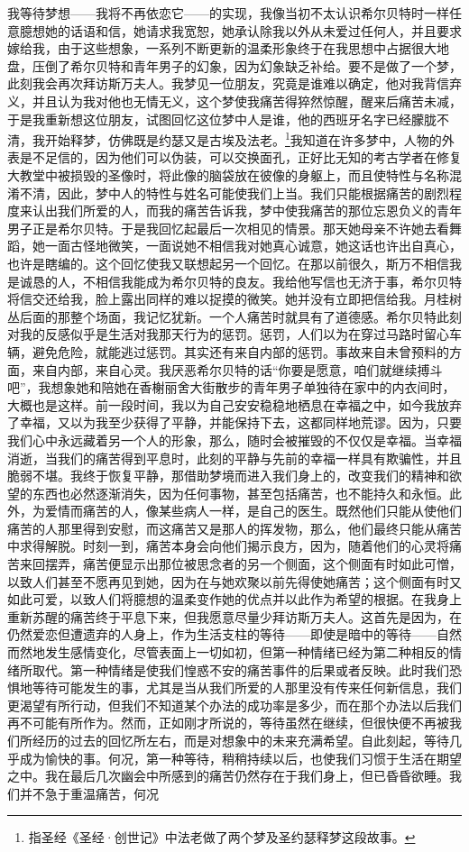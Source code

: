 \par 我等待梦想——我将不再依恋它——的实现，我像当初不太认识希尔贝特时一样任意臆想她的话语和信，她请求我宽恕，她承认除我以外从未爱过任何人，并且要求嫁给我，由于这些想象，一系列不断更新的温柔形象终于在我思想中占据很大地盘，压倒了希尔贝特和青年男子的幻象，因为幻象缺乏补给。要不是做了一个梦，此刻我会再次拜访斯万夫人。我梦见一位朋友，究竟是谁难以确定，他对我背信弃义，并且认为我对他也无情无义，这个梦使我痛苦得猝然惊醒，醒来后痛苦未减，于是我重新想这位朋友，试图回忆这位梦中人是谁，他的西班牙名字已经朦胧不清，我开始释梦，仿佛既是约瑟又是古埃及法老。\footnote{指圣经《圣经·创世记》中法老做了两个梦及圣约瑟释梦这段故事。}我知道在许多梦中，人物的外表是不足信的，因为他们可以伪装，可以交换面孔，正好比无知的考古学者在修复大教堂中被损毁的圣像时，将此像的脑袋放在彼像的身躯上，而且使特性与名称混淆不清，因此，梦中人的特性与姓名可能使我们上当。我们只能根据痛苦的剧烈程度来认出我们所爱的人，而我的痛苦告诉我，梦中使我痛苦的那位忘恩负义的青年男子正是希尔贝特。于是我回忆起最后一次相见的情景。那天她母亲不许她去看舞蹈，她一面古怪地微笑，一面说她不相信我对她真心诚意，她这话也许出自真心，也许是瞎编的。这个回忆使我又联想起另一个回忆。在那以前很久，斯万不相信我是诚恳的人，不相信我能成为希尔贝特的良友。我给他写信也无济于事，希尔贝特将信交还给我，脸上露出同样的难以捉摸的微笑。她并没有立即把信给我。月桂树丛后面的那整个场面，我记忆犹新。一个人痛苦时就具有了道德感。希尔贝特此刻对我的反感似乎是生活对我那天行为的惩罚。惩罚，人们以为在穿过马路时留心车辆，避免危险，就能逃过惩罚。其实还有来自内部的惩罚。事故来自未曾预料的方面，来自内部，来自心灵。我厌恶希尔贝特的话“你要是愿意，咱们就继续搏斗吧”，我想象她和陪她在香榭丽舍大街散步的青年男子单独待在家中的内衣间时，大概也是这样。前一段时间，我以为自己安安稳稳地栖息在幸福之中，如今我放弃了幸福，又以为我至少获得了平静，并能保持下去，这都同样地荒谬。因为，只要我们心中永远藏着另一个人的形象，那么，随时会被摧毁的不仅仅是幸福。当幸福消逝，当我们的痛苦得到平息时，此刻的平静与先前的幸福一样具有欺骗性，并且脆弱不堪。我终于恢复平静，那借助梦境而进入我们身上的，改变我们的精神和欲望的东西也必然逐渐消失，因为任何事物，甚至包括痛苦，也不能持久和永恒。此外，为爱情而痛苦的人，像某些病人一样，是自己的医生。既然他们只能从使他们痛苦的人那里得到安慰，而这痛苦又是那人的挥发物，那么，他们最终只能从痛苦中求得解脱。时刻一到，痛苦本身会向他们揭示良方，因为，随着他们的心灵将痛苦来回摆弄，痛苦便显示出那位被思念者的另一个侧面，这个侧面有时如此可憎，以致人们甚至不愿再见到她，因为在与她欢聚以前先得使她痛苦；这个侧面有时又如此可爱，以致人们将臆想的温柔变作她的优点并以此作为希望的根据。在我身上重新苏醒的痛苦终于平息下来，但我愿意尽量少拜访斯万夫人。这首先是因为，在仍然爱恋但遭遗弃的人身上，作为生活支柱的等待——即使是暗中的等待——自然而然地发生感情变化，尽管表面上一切如初，但第一种情绪已经为第二种相反的情绪所取代。第一种情绪是使我们惶惑不安的痛苦事件的后果或者反映。此时我们恐惧地等待可能发生的事，尤其是当从我们所爱的人那里没有传来任何新信息，我们更渴望有所行动，但我们不知道某个办法的成功率是多少，而在那个办法以后我们再不可能有所作为。然而，正如刚才所说的，等待虽然在继续，但很快便不再被我们所经历的过去的回忆所左右，而是对想象中的未来充满希望。自此刻起，等待几乎成为愉快的事。何况，第一种等待，稍稍持续以后，也使我们习惯于生活在期望之中。我在最后几次幽会中所感到的痛苦仍然存在于我们身上，但已昏昏欲睡。我们并不急于重温痛苦，何况